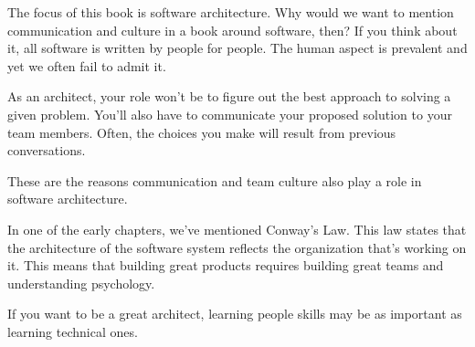 The focus of this book is software architecture. Why would we want to mention communication and culture in a book around software, then? If you think about it, all software is written by people for people. The human aspect is prevalent and yet we often fail to admit it.

As an architect, your role won't be to figure out the best approach to solving a given problem. You'll also have to communicate your proposed solution to your team members. Often, the choices you make will result from previous conversations.

These are the reasons communication and team culture also play a role in software architecture.

In one of the early chapters, we've mentioned Conway's Law. This law states that the architecture of the software system reflects the organization that's working on it. This means that building great products requires building great teams and understanding psychology.

If you want to be a great architect, learning people skills may be as important as learning technical ones.